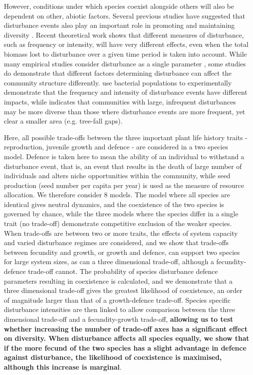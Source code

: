 However, conditions under which species coexist alongside others will also be dependent on other, abiotic factors. Several previous studies have suggested that disturbance events also play an important role in promoting and maintaining diversity \citep[e.g.][]{sousa1984role,denslow1987tropical}.  Recent theoretical work \citep[, Chapter~1]{miller2011frequency,nattrass2012quantifying} shows that different measures of disturbance, such as frequency or intensity, will have very different effects, even when the total biomass lost to disturbance over a given time period is taken into account. While many empirical studies consider disturbance as a single parameter \citep[e.g.][]{molino2001tree,peterson1997tornado,nakagawa2000impact}, some studies do demonstrate that different factors determining disturbance can affect the community structure differently. \cite{hall2012diversity} use bacterial populations to experimentally demonstrate that the frequency and intensity of disturbance events have different impacts, while \cite{denslow1980patterns} indicates that communities with large, infrequent disturbances may be more diverse than those where disturbance events are more frequent, yet clear a smaller area (e.g. tree-fall gaps). 

Here, all possible trade-offs between the three important plant life history traits - reproduction, juvenile growth and defence - are considered in a two species model. Defence is taken here to mean the ability of an individual to withstand a disturbance event, that is, an event that results in the death of large number of individuals and alters niche opportunities within the community, while seed production (seed number per capita per year) is used as the measure of resource allocation. We therefore consider 8 models. The model where all species are identical gives neutral dynamics, and the coexistence of the two species is governed by chance, while the three models where the species differ in a single trait (no trade-off) demonstrate competitive exclusion of the weaker species. When trade-offs are between two or more traits, the effects of system capacity and varied disturbance regimes  are considered, and we show that trade-offs between fecundity and growth, or growth and defence, can support two species for large system sizes, as can a three dimensional trade-off, although a fecundity-defence trade-off cannot. The probability of species disturbance defence parameters resulting in coexistence is calculated, and we demonstrate that a three dimensional trade-off gives the greatest likelihood of coexistence, an order of magnitude larger than that of a growth-defence trade-off. Species specific disturbance intensities are then linked to allow comparison between the three dimensional trade-off and a fecundity-growth trade-off, \textbf{allowing us to test whether increasing the number of trade-off axes has a significant effect on diversity. When disturbance affects all species equally, we show that if the more fecund of the two species has a slight advantage in defence against disturbance, the likelihood of coexistence is maximised, although this increase is marginal}.



